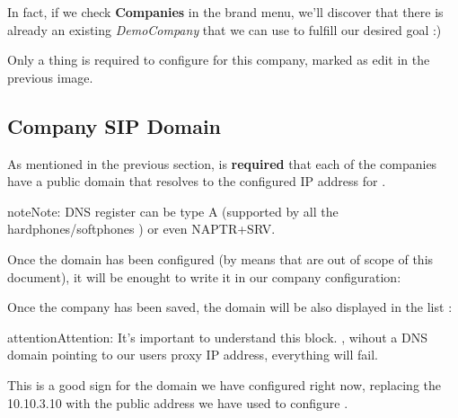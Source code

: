 \documentclass[letterpaper,10pt,english]{sphinxmanual}
\begin{document}
In fact, if we check \textbf{Companies} in the brand menu, we'll discover that there
is already an existing \emph{DemoCompany} that we can use to fulfill our desired
goal :)

\noindent{}

Only a thing is required to configure for this company, marked as edit in the
previous image.


\subsection{Company SIP Domain}
\label{internal_calls/brand_portal:company-sip-domain}\label{internal_calls/brand_portal:domain-per-company}
As mentioned in the previous section, is \textbf{required} that each of the companies
have a public domain that resolves to the configured IP address for
{\hyperref[internal_calls/god_portal:proxyusers]{}}.

\begin{notice}{note}{Note:}
DNS register can be type A (supported by all the hardphones/softphones
) or even NAPTR+SRV.
\end{notice}

Once the domain has been configured (by means that are out of scope of this
document), it will be enought to write it in our company configuration:

\noindent{}

Once the company has been saved, the domain will be also displayed in the list
{\hyperref[internal_calls/god_portal:god\string-sipdomains]{}}:

\noindent{}

\begin{notice}{attention}{Attention:}
It's important to understand this block. {\hyperref[internal_calls/brand_portal:dnshack]{}}, wihout a DNS domain pointing to our
users proxy IP address, everything will fail.
\end{notice}

This is a good sign for the domain we have configured right now, replacing the
10.10.3.10 with the public address we have used to configure {\hyperref[internal_calls/god_portal:proxyusers]{}}.
\end{document}
